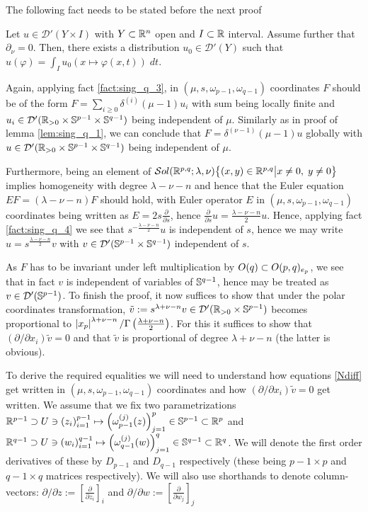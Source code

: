 \documentclass[10pt]{article} %
\newcommand{\D}{\mathcal{D}}
\theoremstyle{definition}
\theoremstyle{remark}
\begin{document}
The following fact needs to be stated before the next proof
\begin{myfact}
	\label{fact:sing_q_4}
	Let $u\in\D'(Y\times I)$ with $Y\subset\mathbb{R}^n$ open and $I\subset\mathbb{R}$ interval. Assume further that
	$\partial_\nu=0$. Then, there exists a distribution $u_0\in\D'(Y)$ such that $u(\varphi)=\int_Iu_0(x\mapsto\varphi(x,t))\;dt$.
\end{myfact}
\begin{myproof}
	Again, applying fact \ref{fact:sing_q_3}, in $(\mu,s,\omega_{p-1},\omega_{q-1})$ coordinates $F$ should be of
	the form $F=\sum_{i\geq0}\delta^{(i)}(\mu-1)u_i$ with sum being locally finite and 
	$u_i\in\D'(\R_{>0}\times\Sp^{p-1}\times
	\Sp^{q-1})$ being independent of $\mu$.
	Similarly as in proof of lemma \ref{lem:sing_q_1},
	we can conclude that $F=\delta^{(\nu-1)}(\mu-1)u$ globally with
	$u\in\D'(\R_{>0}\times\Sp^{p-1}\times
	\Sp^{q-1})$ being independent of $\mu$.

	Furthermore, being an element of $\mathcal{S}ol( \mathbb{R}^{p,q};\lambda,\nu){\left\{(x,y)\in\mathbb{R}^{p,q}\big| x\neq0,\;y\neq0\right\}}$
	implies homogeneity with degree
	$\lambda-\nu-n$ and hence that the Euler equation $EF=(\lambda-\nu-n)F$ should hold, with Euler operator $E$
	in $(\mu,s,\omega_{p-1},\omega_{q-1})$ coordinates being written as $E=2s\frac{\partial}{\partial s}$, hence
	$\frac{\partial}{\partial s}u=\frac{\lambda-\nu-n}{2}u$. Hence, applying fact \ref{fact:sing_q_4}
	we see that $s^{-\frac{\lambda-\nu-n}{2}}u$ is independent of $s$, hence we may write $u=s^{\frac{\lambda-\nu-n}{2}}v$
	with $v\in\D'(\Sp^{p-1}\times\Sp^{q-1})$ independent of $s$.

	As $F$ has to be invariant under left multiplication by $O(q)\subset O(p,q)_{e_p}$, we see that in fact $v$ is independent
	of variables of $\mathbb{S}^{q-1}$, hence may be treated as $v\in\D'(\Sp^{p-1})$.
	To finish the proof, it now 
	suffices to show that under the polar coordinates transformation, $\tilde{v}:=s^{\lambda+\nu-n}v\in
	\D'(\R_{>0}\times\Sp^{p-1})$
	becomes proportional to $\left|x_p\right|^{\lambda+\nu-n}/\Gamma\left( \frac{\lambda+\nu-n}{2} \right)$. For this it suffices
	to show that $(\partial/\partial x_i)\tilde{v}=0$ and that $\tilde{v}$ is proportional of degree $\lambda+\nu-n$
	(the latter is obvious).

	To derive the required equalities we will need to understand how equations \eqref{Ndiff} get written in $(\mu,s,\omega_{p-1},
	\omega_{q-1})$ coordinates and how $(\partial/\partial x_i)\tilde{v}=0$ get written. We assume that we fix two 
	parametrizations $\mathbb{R}^{p-1}\supset U\ni\left( z_i \right)_{i=1}^{p-1}\mapsto\left( \omega_{p-1}^{(j)}(z) \right)_{j=1}^{p}\in
	\mathbb{S}^{p-1}\subset\mathbb{R}^p$ and 
	$\mathbb{R}^{q-1}\supset U\ni\left( w_i \right)_{i=1}^{q-1}\mapsto\left( \omega_{q-1}^{(j)}(w) \right)_{j=1}^{q}\in
	\mathbb{S}^{q-1}\subset\mathbb{R}^q$. We will denote the first order derivatives of these by $D_{p-1}$ and $D_{q-1}$ respectively
	(these being $p-1\times p$ and $q-1\times q$ matrices respectively). We will also use shorthands to denote column-vectors:
	$\partial/\partial z:=\left[ \frac{\partial}{\partial z_i} \right]_i$ and 
	$\partial/\partial w:=\left[ \frac{\partial}{\partial w_j} \right]_j$


\end{myproof}
\end{document}
